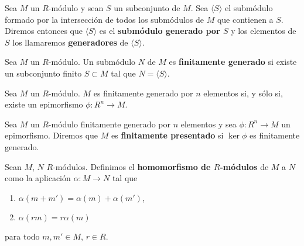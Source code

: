 \begin{definicion}
	Sea $M$ un $R$-módulo y sean $S$ un subconjunto de $M$. Sea
	$\langle S \rangle$ el submódulo formado por la intersección de todos los
	submódulos de $M$ que contienen a $S$. Diremos entonces que $\langle S \rangle$
	es el \textbf{submódulo generado por $S$} y los elementos de $S$ los
	llamaremos \textbf{generadores} de $\langle S \rangle$.
\end{definicion}

\begin{definicion}
	Sea $M$ un $R$-módulo. Un submódulo $N$ de $M$ es \textbf{finitamente generado}
	si existe un subconjunto finito $S \subset M$ tal que $N = \langle S \rangle$.
\end{definicion}

\begin{lema}
	Sea $M$ un $R$-módulo. $M$ es finitamente generado por $n$ elementos si, y sólo
	si, existe un epimorfismo $\phi : R^{n} \to M$.
\end{lema}
%

\begin{definicion}
	Sea $M$ un $R$-módulo finitamente generado por $n$ elementos y sea $\phi : R^{n}
	\to M$ un epimorfismo. Diremos que $M$ es \textbf{finitamente presentado} si $\ker
	\phi$ es finitamente generado.
\end{definicion}

\begin{definicion}
	Sean $M$, $N$ $R$-módulos. Definimos el \textbf{homomorfismo de $R$-módulos}
	de $M$ a $N$ como la aplicación $\alpha: M \rightarrow N$ tal que
	\begin{enumerate}
		\item $\alpha(m+m') = \alpha(m) + \alpha(m')$,
		
		\item $\alpha(rm) = r\alpha(m)$
	\end{enumerate}
	para todo $m,m' \in M$, $r \in R$.
\end{definicion}

